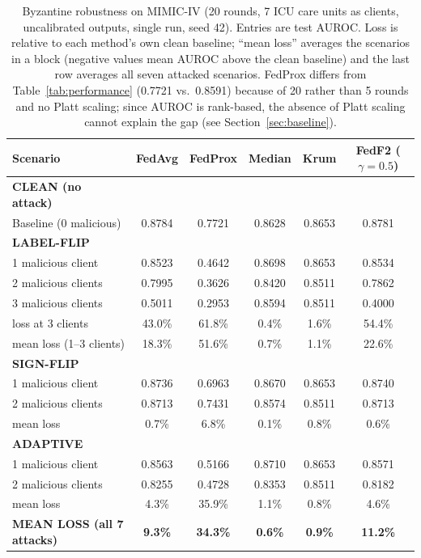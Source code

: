 \documentclass[journal]{IEEEtran}
\begin{document}
\begin{table}[t]
\caption{Byzantine robustness on MIMIC-IV (20 rounds, 7 ICU care units as clients, uncalibrated outputs, single run, seed 42). Entries are test AUROC. Loss is relative to each method's own clean baseline; ``mean loss'' averages the scenarios in a block (negative values mean AUROC above the clean baseline) and the last row averages all seven attacked scenarios. FedProx differs from Table~\ref{tab:performance} (0.7721 vs.\ 0.8591) because of 20 rather than 5 rounds and no Platt scaling; since AUROC is rank-based, the absence of Platt scaling cannot explain the gap (see Section~\ref{sec:baseline}).}
\centering
\small
\begin{tabular}{lccccc}
\toprule
\textbf{Scenario} & \textbf{FedAvg} & \textbf{FedProx} & \textbf{Median} & \textbf{Krum} & \textbf{FedF2 ($\gamma=0.5$)} \\
\midrule
\textbf{CLEAN (no attack)} &  &  &  &  &  \\
  Baseline (0 malicious) & 0.8784 & 0.7721 & 0.8628 & 0.8653 & 0.8781 \\
\midrule
\textbf{LABEL-FLIP} &  &  &  &  &  \\
  1 malicious client & 0.8523 & 0.4642 & 0.8698 & 0.8653 & 0.8534 \\
  2 malicious clients & 0.7995 & 0.3626 & 0.8420 & 0.8511 & 0.7862 \\
  3 malicious clients & 0.5011 & 0.2953 & 0.8594 & 0.8511 & 0.4000 \\
  \hspace{2em} loss at 3 clients & 43.0\% & 61.8\% & 0.4\% & 1.6\% & 54.4\% \\
  \hspace{2em} mean loss (1--3 clients) & 18.3\% & 51.6\% & 0.7\% & 1.1\% & 22.6\% \\
\midrule
\textbf{SIGN-FLIP} &  &  &  &  &  \\
  1 malicious client & 0.8736 & 0.6963 & 0.8670 & 0.8653 & 0.8740 \\
  2 malicious clients & 0.8713 & 0.7431 & 0.8574 & 0.8511 & 0.8713 \\
  \hspace{2em} mean loss & 0.7\% & 6.8\% & 0.1\% & 0.8\% & 0.6\% \\
\midrule
\textbf{ADAPTIVE} &  &  &  &  &  \\
  1 malicious client & 0.8563 & 0.5166 & 0.8710 & 0.8653 & 0.8571 \\
  2 malicious clients & 0.8255 & 0.4728 & 0.8353 & 0.8511 & 0.8182 \\
  \hspace{2em} mean loss & 4.3\% & 35.9\% & 1.1\% & 0.8\% & 4.6\% \\
\midrule
\textbf{MEAN LOSS (all 7 attacks)} & \textbf{9.3\%} & \textbf{34.3\%} & \textbf{0.6\%} & \textbf{0.9\%} & \textbf{11.2\%} \\
\bottomrule
\end{tabular}
\label{tab:byzantine_robustness}
\end{table}
\end{document}
